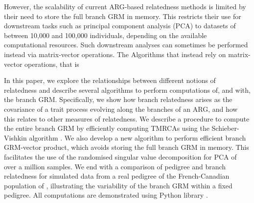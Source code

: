 However, the scalability of current ARG-based relatedness methods is limited by their need to store the full branch GRM in memory. This restricts their use for downstream tasks such as principal component analysis (PCA) to datasets of between 10,000 and 100,000 individuals, depending on the available computational resources. Such downstream analyses can sometimes be performed instead via matrix-vector operations. The Algorithms that instead rely on matrix-vector operations, that is 
%
%
%
%


In this paper, we explore the relationships between different notions of relatedness and
describe several algorithms to perform computations of, and with, the branch GRM.
%
Specifically, we show how branch relatedness arises as
the covariance of a trait process evolving along the branches of an ARG,
and how this relates to other measures of relatedness.
%
We describe a procedure to compute the entire branch GRM by efficiently computing TMRCAs
using the Schieber-Vishkin algorithm \citep{Schieber1988On}.
%
We also develop a new algorithm to perform efficient branch GRM-vector product,
which avoids storing the full branch GRM in memory.
%
This facilitates the use of the randomised singular value decomposition \citep{halko2011findingstructure}
for PCA of over a million samples.
%
We end with a comparison of pedigree and branch relatedness
for simulated data from a real pedigree of the French-Canadian population of
\citet{andersontrocme2023genes},
illustrating the variability of the branch GRM within a fixed pedigree.
%
All computations are demonstrated using Python \tskit{} library
\citep{ralph2020efficiently, kelleher2024tskit}.
